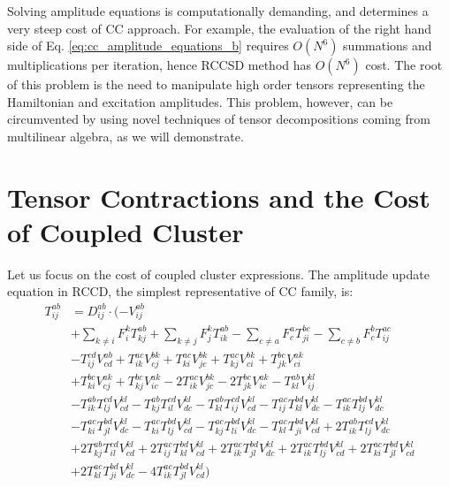 Solving amplitude equations is computationally demanding, and determines a 
very steep cost of CC approach. For example, the evaluation of 
the right hand side of Eq. \ref{eq:cc_amplitude_equations_b} requires 
$O(N^6)$ summations and multiplications per iteration, hence RCCSD method has 
$O(N^6)$ cost. The root of this problem is the need to manipulate high order 
tensors representing the Hamiltonian and excitation amplitudes. This problem, 
however, can be circumvented by using novel techniques of tensor 
decompositions coming from multilinear algebra,\cite{kolda2009tensor} as we 
will demonstrate. 

\section{Tensor Contractions and the Cost of Coupled Cluster}
Let us focus on the cost of coupled cluster expressions. The amplitude update 
equation in RCCD, the simplest representative of CC family, is:
%
\begin{equation}
\begin{split}
T^{ab}_{ij} & = D^{ab}_{ij} \cdot (- V^{ab}_{ij} \\
& + \sum_{k \neq i} F^{k}_{i} T^{ab}_{kj}
+  \sum_{k \neq j} F^{k}_{j}  T^{ab}_{ik}
- \sum_{c \neq a} F^{a}_{c}  T^{bc}_{ji}
- \sum_{c \neq b} F^{b}_{c}  T^{ac}_{ij} \\
& - T^{cd}_{ij}  V^{ab}_{cd}
+ T^{ac}_{ik}  V^{bk}_{cj} 
+ T^{ac}_{ki}  V^{bk}_{jc} 
+ T^{ac}_{kj}  V^{bk}_{ci} 
+ T^{bc}_{jk}  V^{ak}_{ci}\\
&+ T^{bc}_{ki}  V^{ak}_{cj} 
+ T^{bc}_{kj}  V^{ak}_{ic}
- 2 T^{ac}_{ik}  V^{bk}_{jc}
- 2 T^{bc}_{jk}  V^{ak}_{ic}
- T^{ab}_{kl}  V^{kl}_{ij} \\
&- T^{ab}_{ik}  T^{cd}_{lj}  V^{kl}_{cd} 
- T^{ab}_{kj}  T^{cd}_{il} V^{kl}_{dc}
- T^{ab}_{kl}  T^{cd}_{ij} V^{kl}_{cd}
- T^{ac}_{ij}  T^{bd}_{kl}  V^{kl}_{dc}
-  T^{ac}_{ik}  T^{bd}_{lj} V^{kl}_{dc} \\
&- T^{ac}_{ki}  T^{bd}_{jl} V^{kl}_{dc}
- T^{ac}_{ki}  T^{bd}_{lj} V^{kl}_{cd}
- T^{ac}_{kj}  T^{bd}_{li} V^{kl}_{dc}
-  T^{ac}_{kl}  T^{bd}_{ji} V^{kl}_{cd}
+ 2    T^{ab}_{ik} T^{cd}_{lj}  V^{kl}_{dc}\\
&+ 2    T^{ab}_{kj} T^{cd}_{il}  V^{kl}_{cd}
+ 2    T^{ac}_{ij} T^{bd}_{kl}  V^{kl}_{cd}
+ 2    T^{ac}_{ik}  T^{bd}_{jl}  V^{kl}_{dc}
+ 2    T^{ac}_{ik}  T^{bd}_{lj}  V^{kl}_{cd}  
+ 2    T^{ac}_{ki} T^{bd}_{jl}  V^{kl}_{cd}\\
&+ 2    T^{ac}_{kl} T^{bd}_{ji}  V^{kl}_{dc}
- 4    T^{ac}_{ik} T^{bd}_{jl}  V^{kl}_{cd})
\end{split}
\label{eq:ccd_amplitude_equation}
\end{equation}
